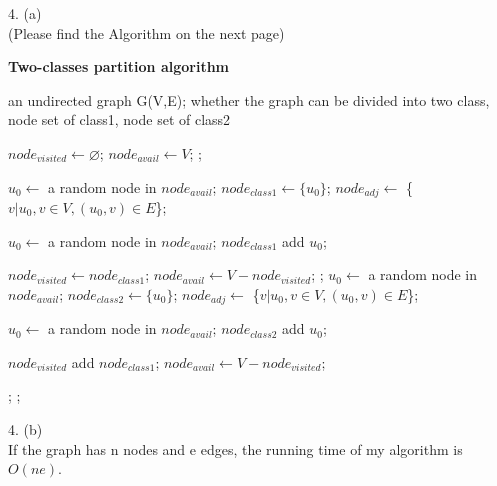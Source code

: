 \documentclass[a4paper]{article}
\begin{document}
4. (a)\\
(Please find the Algorithm on the next page)
  \begin{algorithm}[H]
  \caption{ \Large{\textbf{Two-classes partition algorithm}}}  
  \label{alg:Framwork}  
  \begin{algorithmic}[1]  
    \Require an undirected graph G(V,E);
    \Ensure whether the graph can be divided into two class, node set of class1, node set of class2
    
    \State $node_{visited} \gets \varnothing$;
    \State $node_{avail} \gets V$;
    	\State {};
    \EndIf
    
    \State $u_0 \gets$ a random node in $node_{avail}$;
    \State $node_{class1} \gets \{u_0\}$;
    \State $node_{adj} \gets$ \{$v|u_0,v \in V, (u_0, v) \in E$\};
    
    	\State $u_0 \gets$ a random node in $node_{avail}$;
        \State $node_{class1}$ add $u_0$;
    \EndWhile
    
    
    \State $node_{visited} \gets node_{class1}$;
    \State $node_{avail} \gets V-node_{visited}$;
    	\State {};
    \EndIf    
    \State $u_0 \gets$ a random node in $node_{avail}$;
    \State $node_{class2} \gets \{u_0\}$;
    \State $node_{adj} \gets$ \{$v|u_0,v \in V, (u_0, v) \in E$\};
    
    	\State $u_0 \gets$ a random node in $node_{avail}$;
        \State $node_{class2}$ add $u_0$;
    \EndWhile
    
    \State $node_{visited}$ add $node_{class1}$;
    \State $node_{avail} \gets V-node_{visited}$;
    
    	\State {};
    \Else \;
    	\State {};
    \EndIf 
   
    \EndFunction
  \end{algorithmic}  
\end{algorithm}  

4. (b)\\
If the graph has n nodes and e edges, the running time of my algorithm is $O(ne)$.
\end{document}
